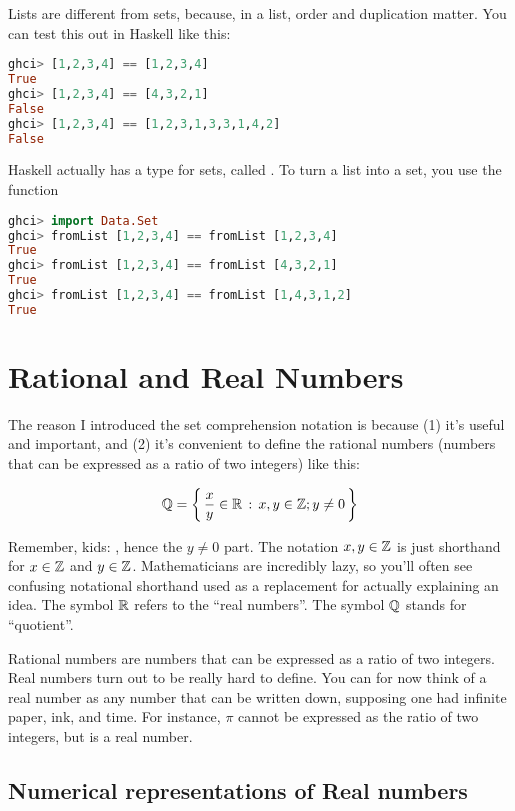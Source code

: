 Lists are different from sets, because, in a list, order and
duplication matter. You can test this out in Haskell like this:

\begin{lstlisting}[language=Haskell,caption={List equality in Haskell}]
ghci> [1,2,3,4] == [1,2,3,4]
True
ghci> [1,2,3,4] == [4,3,2,1]
False
ghci> [1,2,3,4] == [1,2,3,1,3,3,1,4,2]
False
\end{lstlisting}

Haskell actually has a type for sets, called . To turn
a list into a set, you use the function 

\begin{lstlisting}[language=Haskell,caption={Set equality in Haskell}]
ghci> import Data.Set
ghci> fromList [1,2,3,4] == fromList [1,2,3,4]
True
ghci> fromList [1,2,3,4] == fromList [4,3,2,1]
True
ghci> fromList [1,2,3,4] == fromList [1,4,3,1,2]
True
\end{lstlisting}

\section{Rational and Real Numbers}

The reason I introduced the set comprehension notation is because (1)
it's useful and important, and (2) it's convenient to define the
rational numbers (numbers that can be expressed as a ratio of two
integers) like this:

\begin{displaymath}
  \mathbb{Q} = \left\{ \,  \frac{x}{y} \in \mathbb{R} \, : \, x, y \in \mathbb{Z}; y \ne 0  \, \right\}
\end{displaymath}

Remember, kids: , hence the $y \ne 0$
part. The notation $x, y \in \mathbb{Z}$ is just shorthand for $x \in \mathbb{Z}$ and
$y \in \mathbb{Z}$. Mathematicians are incredibly lazy, so you'll often see
confusing notational shorthand used as a replacement for actually
explaining an idea. The symbol $\mathbb{R}$ refers to the ``real
numbers''. The symbol $\mathbb{Q}$ stands for ``quotient''.

Rational numbers are numbers that can be expressed as a ratio of two
integers. Real numbers turn out to be really hard to define. You can
for now think of a real number as any number that can be written down,
supposing one had infinite paper, ink, and time. For instance, $\pi$
cannot be expressed as the ratio of two integers, but is a real
number.

\subsection{Numerical representations of Real numbers}

